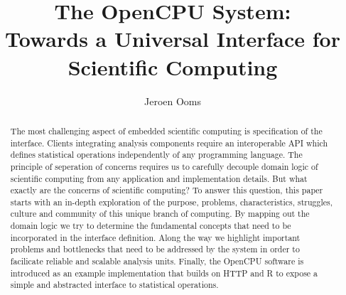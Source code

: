 \documentclass{article}
\author{Jeroen Ooms}
\title{The OpenCPU System:\\ Towards a Universal Interface for Scientific Computing}
\begin{document}
\maketitle

\begin{abstract}
The most challenging aspect of embedded scientific computing is specification of the interface. Clients integrating analysis components require an interoperable API which defines statistical operations independently of any programming language. The principle of seperation of concerns requires us to carefully decouple domain logic of scientific computing from any application and implementation details. But what exactly are the concerns of scientific computing? To answer this question, this paper starts with an in-depth exploration of the purpose, problems, characteristics, struggles, culture and community of this unique branch of computing. By mapping out the domain logic we try to determine the fundamental concepts that need to be incorporated in the interface definition. Along the way we highlight important problems and bottlenecks that need to be addressed by the system in order to facilicate reliable and scalable analysis units. Finally, the OpenCPU software is introduced as an example implementation that builds on HTTP and R to expose a simple and abstracted interface to statistical operations.
\end{abstract}







 






\end{document}

